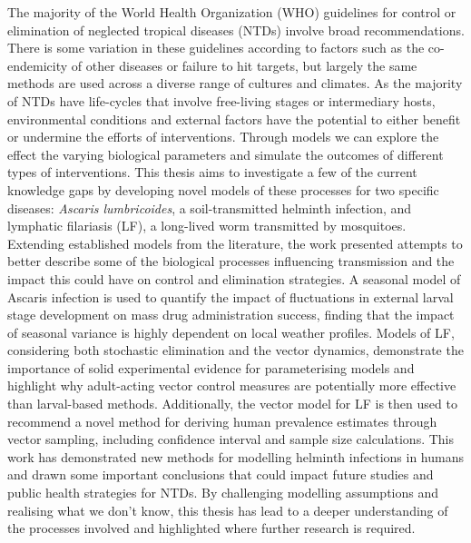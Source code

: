 \documentclass[11pt,a4paper]{report}      %
\begin{document}
\begin{thesisabstract}
\begin{onehalfspace}    
\noindent The majority of the World Health Organization (WHO) guidelines for control or elimination of neglected tropical diseases (NTDs) involve broad recommendations. There is some variation in these guidelines according to factors such as the co-endemicity of other diseases or failure to hit targets, but largely the same methods are used across a diverse range of cultures and climates. As the majority of NTDs have life-cycles that involve free-living stages or intermediary hosts, environmental conditions and external factors have the potential to either benefit or undermine the efforts of interventions. Through models we can explore the effect the varying biological parameters and simulate the outcomes of different types of interventions. This thesis aims to investigate a few of the current knowledge gaps by developing novel models of these processes for two specific diseases: \textit{Ascaris lumbricoides}, a soil-transmitted helminth infection, and lymphatic filariasis (LF), a long-lived worm transmitted by mosquitoes. Extending established models from the literature, the work presented attempts to better describe some of the biological processes influencing transmission and the impact this could have on control and elimination strategies. A seasonal model of Ascaris infection is used to quantify the impact of fluctuations in external larval stage development on mass drug administration success, finding that the impact of seasonal variance is highly dependent on local weather profiles. Models of LF, considering both stochastic elimination and the vector dynamics, demonstrate the importance of solid experimental evidence for parameterising models and highlight why adult-acting vector control measures are potentially more effective than larval-based methods. Additionally, the vector model for LF is then used to recommend a novel method for deriving human prevalence estimates through vector sampling, including confidence interval and sample size calculations. This work has demonstrated new methods for modelling helminth infections in humans and drawn some important conclusions that could impact future studies and public health strategies for NTDs. By challenging modelling assumptions and realising what we don't know, this thesis has lead to a deeper understanding of the processes involved and highlighted where further research is required.


\end{onehalfspace}
\end{thesisabstract}
\end{document}
